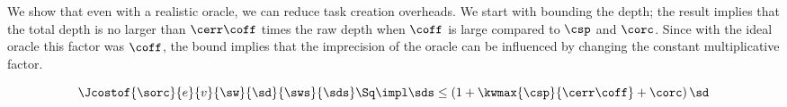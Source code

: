 We show that even with a realistic oracle, we can reduce task creation
overheads.  We start with bounding the depth; the result implies that
the total depth is no larger than $\cerr\coff$ times the raw depth
when $\coff$ is large compared to $\csp$ and $\corc$.  Since with the
ideal oracle this factor was $\coff$, the bound implies that the
imprecision of the oracle can be influenced by changing the
constant multiplicative factor.

\begin{theorem}
\label{thm:orc-cost-depth}
\label{thm:real-orc-depth}
$$\Jcostof{\sorc}{ e }{v}{\sw}{\sd}{\sws}{\sds} \Sq\impl \sds \leq (1+\kwmax{\csp}{\cerr\coff}+\corc)\,\sd$$
\end{theorem}

